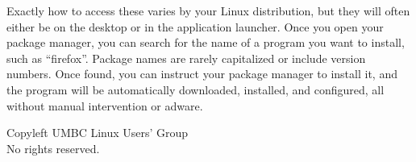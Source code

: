 \documentclass[11pt,notumble]{leaflet}
\begin{document}
Exactly how to access these varies by your Linux distribution, but they will
often either be on the desktop or in the application launcher. Once you open
your package manager, you can search for the name of a program you want to
install, such as ``firefox''. Package names are rarely capitalized or include
version numbers. Once found, you can instruct your package manager to install
it, and the program will be automatically downloaded, installed, and configured,
all without manual intervention or adware.


\vfill

\begin{center} \small 
    \textcopyleft{} Copyleft \the\year{} UMBC Linux Users' Group \\
    No rights reserved.
\end{center}
\end{document}
